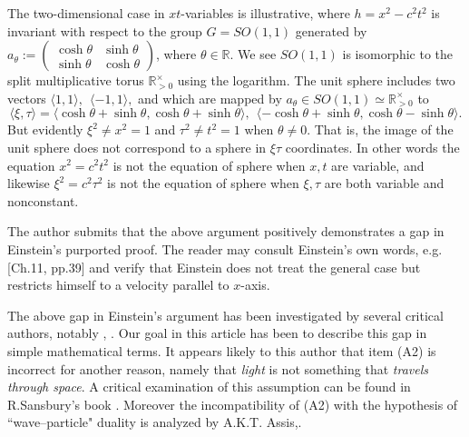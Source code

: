 \documentclass[12pt]{amsart}
\theoremstyle{definition}
\theoremstyle{remark}
\newcommand{\bR}{\mathbb{R}}
\newcommand{\del}{\partial}
\begin{document}
The two-dimensional case in $xt$-variables is illustrative, where $h=x^2-c^2 t^2$ is invariant with respect to the group $G=SO(1,1)$ generated by $a_\theta:=\begin{pmatrix} \cosh \theta & \sinh \theta \\
\sinh \theta & \cosh \theta
\end{pmatrix}$, where $\theta\in \bR$. We see $SO(1,1)$ is isomorphic to the split multiplicative torus $\bR^\times _{>0}$ using the logarithm. The unit sphere includes two vectors $\langle 1, 1 \rangle,~~ \langle -1,1\rangle,$ and which are mapped by $a_\theta \in SO(1,1) \simeq \bR^\times_{>0}$ to $$\langle \xi,\tau\rangle=\langle \cosh \theta+\sinh \theta, \cosh \theta+\sinh \theta \rangle,~~ \langle -\cosh \theta+\sinh \theta, \cosh \theta-\sinh \theta \rangle.$$ But evidently $\xi^2 \neq x^2=1$ and $\tau^2 \neq t^2=1$ when $\theta\neq 0$. That is, the image of the unit sphere does not correspond to a sphere in $\xi \tau$ coordinates. In other words the equation $x^2 = c^2 t^2$ is not the equation of sphere when $x,t$ are variable, and likewise $\xi^2=c^2 \tau^2$ is not the equation of sphere when $\xi,\tau$ are both variable and nonconstant. 

The author submits that the above argument positively demonstrates a gap in Einstein's purported proof. The reader may consult Einstein's own words, e.g. \cite{einstein2019relativity}[Ch.11, pp.39] and verify that Einstein does not treat the general case but restricts himself to a velocity parallel to $x$-axis.  


The above gap in Einstein's argument has been investigated by several critical authors, notably \cite{bryant}, \cite{crothers}. Our goal in this article has been to describe this gap in simple mathematical terms. It appears likely to this author that item (A2) is incorrect for another reason, namely that \emph{light} is not something that \emph{travels through space}. A critical examination of this assumption can be found in R.Sansbury's book \cite{sansburyspeed}. Moreover the incompatibility of (A2) with the hypothesis of ``wave--particle" duality is analyzed by A.K.T. Assis,\cite[\S 7.2.4, pp.133]{assis1999relational}.
\end{document}
